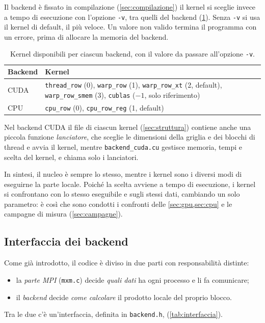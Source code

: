 \documentclass[11pt,a4paper]{article}
\begin{document}
Il backend è fissato in compilazione (\cref{sec:compilazione})
il kernel si sceglie invece a tempo di esecuzione con
l'opzione \texttt{-v}, tra quelli del backend
(\cref{tab:kernel}). Senza \texttt{-v} si usa il kernel di default, il più
veloce. Un valore non valido termina il programma con un errore, prima di
allocare la memoria del backend.

\begin{table}[H]
  \centering
  \caption{Kernel disponibili per ciascun backend, con il valore da passare
    all'opzione \texttt{-v}.}\label{tab:kernel}
  \begin{tabular}{l p{}}
    \toprule
    Backend & Kernel \\
    \midrule
    CUDA & \texttt{thread\_row} (0), \texttt{warp\_row} (1),
           \texttt{warp\_row\_xt} (2, default), \texttt{warp\_row\_smem} (3),
           \texttt{cublas} ($-1$, solo riferimento) \\
    CPU  & \texttt{cpu\_row} (0), \texttt{cpu\_row\_reg} (1, default) \\
    \bottomrule
  \end{tabular}
\end{table}

Nel backend CUDA il file di ciascun kernel (\cref{sec:struttura}) contiene
anche una piccola funzione \emph{lanciatore}, che sceglie le dimensioni della
griglia e dei blocchi di thread e avvia il kernel, mentre \texttt{backend\_cuda.cu}
gestisce memoria, tempi e scelta del kernel, e chiama solo i lanciatori.

In sintesi, il nucleo è sempre lo stesso, mentre i kernel sono i diversi modi
di eseguirne la parte locale. Poiché la scelta avviene a tempo di esecuzione,
i kernel si confrontano con lo stesso eseguibile e sugli stessi dati,
cambiando un solo parametro: è così che sono condotti i confronti delle
\cref{sec:gpu,sec:cpu} e le campagne di misura (\cref{sec:campagne}).

\subsection{Interfaccia dei backend}\label{sec:interfaccia}

Come già introdotto, il codice è diviso in due parti con responsabilità
distinte:
\begin{itemize}
  \item la \emph{parte MPI} (\texttt{mxm.c}) decide \emph{quali dati} ha ogni
        processo e li fa comunicare;
  \item il \emph{backend} decide \emph{come calcolare} il prodotto locale del
        proprio blocco.
\end{itemize}
Tra le due c'è un'interfaccia, definita in \texttt{backend.h},
(\cref{tab:interfaccia}).
\end{document}
